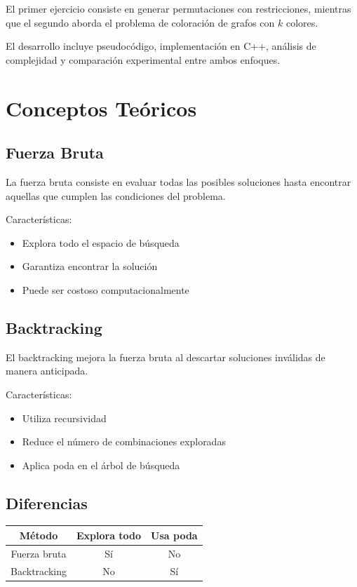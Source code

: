 \documentclass[12pt]{article}
\begin{document}
El primer ejercicio consiste en generar permutaciones con restricciones, mientras que el segundo aborda el problema de coloración de grafos con $k$ colores.

El desarrollo incluye pseudocódigo, implementación en C++, análisis de complejidad y comparación experimental entre ambos enfoques.


\section{Conceptos Teóricos}

\subsection{Fuerza Bruta}

La fuerza bruta consiste en evaluar todas las posibles soluciones hasta encontrar aquellas que cumplen las condiciones del problema.

Características:

\begin{itemize}
\item Explora todo el espacio de búsqueda
\item Garantiza encontrar la solución
\item Puede ser costoso computacionalmente
\end{itemize}

\subsection{Backtracking}

El backtracking mejora la fuerza bruta al descartar soluciones inválidas de manera anticipada.

Características:

\begin{itemize}
\item Utiliza recursividad
\item Reduce el número de combinaciones exploradas
\item Aplica poda en el árbol de búsqueda
\end{itemize}

\subsection{Diferencias}

\begin{center}
\begin{tabular}{|c|c|c|}
\hline
Método & Explora todo & Usa poda \\
\hline
Fuerza bruta & Sí & No \\
Backtracking & No & Sí \\
\hline
\end{tabular}
\end{center}
\end{document}
